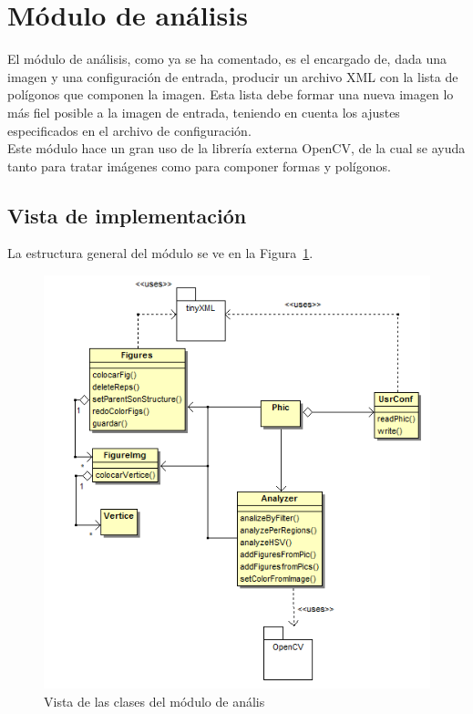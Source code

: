 \section{Módulo de análisis}
\label{sec:modanal}


El módulo de análisis, como ya se ha comentado, es el encargado de, dada una imagen y una configuración de entrada, producir un archivo XML con la lista de polígonos que componen la imagen. Esta lista debe formar una nueva imagen lo más fiel posible a la imagen de entrada, teniendo en cuenta los ajustes especificados en el archivo de configuración.\\

Este módulo hace un gran uso de la librería externa OpenCV, de la cual se ayuda tanto para tratar imágenes como para componer formas y polígonos.

\subsection{Vista de implementación}

La estructura general del módulo se ve en la Figura~\ref{fig:diagramaclasesPHIC}.\\

		\begin{figure}[htbp]
		\centering
		\includegraphics[scale=0.6]{graphics/diagramaclasesPHIC.png}
		\caption{Vista de las clases del módulo de anális}
		\label{fig:diagramaclasesPHIC}
		\end{figure}
		
